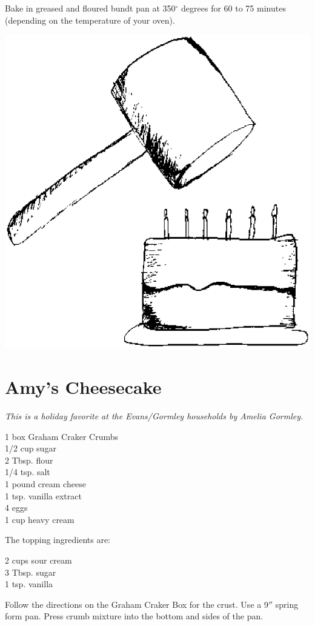 Bake in greased and floured bundt pan at 350$^{\circ}$ degrees for 60 to 75
minutes (depending on the temperature of your oven).

\vspace{2\baselineskip}
\centerline{
\includegraphics[scale=.5,clip]{pound.ps}}
\vspace{2\baselineskip}

\section{Amy's Cheesecake}

\textit{This is a holiday favorite at the Evans/Gormley households by
 Amelia Gormley.}
\begin{ingredients}
1 box Graham Craker Crumbs \\
1/2 cup sugar \\
2 Tbsp.  flour \\
1/4 tsp.  salt \\
1 pound cream cheese \\
1 tsp.  vanilla extract \\
4 eggs \\
1 cup heavy cream
\end{ingredients}
The topping ingredients are:
\begin{ingredients}
2 cups sour cream \\
3 Tbsp.  sugar \\
1 tsp.  vanilla
\end{ingredients}
Follow the directions on the Graham Craker Box for the crust.  
Use a 9$''$ spring form pan.  Press crumb mixture into the bottom 
and sides of the pan.

